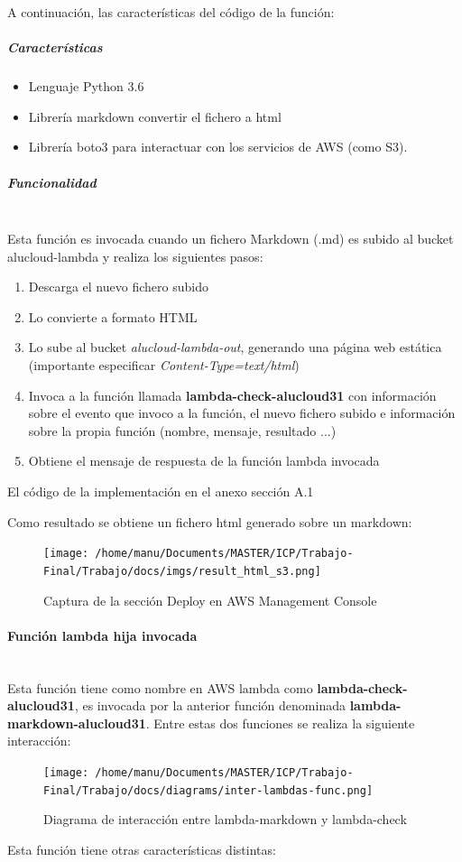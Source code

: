 \documentclass[
]{article}
\begin{document}
A continuación, las características del código de la función:

\hypertarget{header-n42}{%
\subparagraph{Características}\label{header-n42}}

\begin{itemize}
\item
  Lenguaje Python 3.6
\item
  Librería markdown convertir el fichero a html
\item
  Librería boto3 para interactuar con los servicios de AWS (como S3).
\end{itemize}

\hypertarget{header-n50}{%
\subparagraph{Funcionalidad}\label{header-n50}}
\leavevmode
\newline
\\
Esta función es invocada cuando un fichero Markdown (.md) es subido al
bucket alucloud-lambda y realiza los siguientes pasos:

\begin{enumerate}
\def\labelenumi{\arabic{enumi}.}
\item
  Descarga el nuevo fichero subido
\item
  Lo convierte a formato HTML
\item
  Lo sube al bucket \emph{alucloud-lambda-out}, generando una página web
  estática (importante especificar \emph{Content-Type=text/html})
\item
  Invoca a la función llamada \textbf{lambda-check-alucloud31} con
  información sobre el evento que invoco a la función, el nuevo fichero
  subido e información sobre la propia función (nombre, mensaje,
  resultado ...)
\item
  Obtiene el mensaje de respuesta de la función lambda invocada
\end{enumerate}

El código de la implementación en el anexo sección A.1

Como resultado se obtiene un fichero html generado sobre un markdown:
\begin{figure}[H]
\centering
\texttt{[image: /home/manu/Documents/MASTER/ICP/Trabajo-Final/Trabajo/docs/imgs/result\_html\_s3.png]}
\caption{Captura de la sección Deploy en AWS Management Console}
\end{figure}

\hypertarget{header-n65}{%
\paragraph{Función lambda hija invocada}\label{header-n65}}
\leavevmode
\newline
\\
Esta función tiene como nombre en AWS lambda como
\textbf{lambda-check-alucloud31}, es invocada por la anterior función
denominada \textbf{lambda-markdown-alucloud31}. Entre estas dos funciones se realiza
la siguiente interacción:
\begin{figure}[H]
\centering
\texttt{[image: /home/manu/Documents/MASTER/ICP/Trabajo-Final/Trabajo/docs/diagrams/inter-lambdas-func.png]}
\caption{Diagrama de interacción entre lambda-markdown y lambda-check}
\end{figure}
Esta función tiene otras características distintas:
\end{document}
